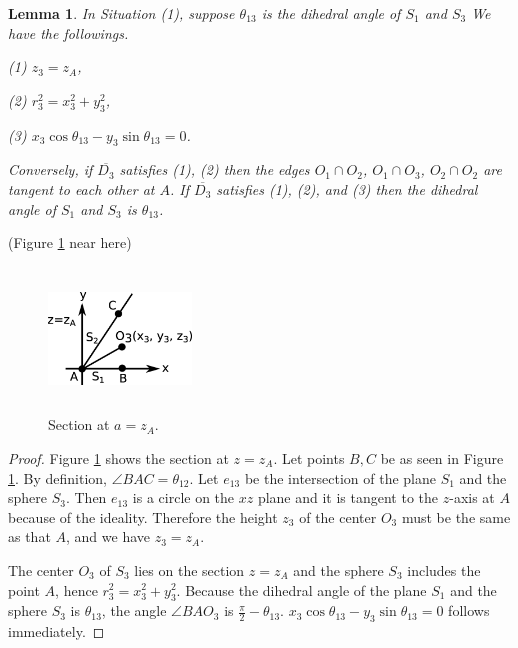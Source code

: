 \documentclass[suppldata, dvipdfmx]{interact}
\theoremstyle{plain}%
\newtheorem{lemma}[theorem]{Lemma}
\theoremstyle{definition}
\theoremstyle{remark}
\theoremstyle{problemstyle}
\begin{document}
\begin{lemma} \label{lemma:CenterOfSphere}
In Situation (1), suppose $\theta_{13}$ is the dihedral angle of $S_1$ and $S_3$   We have the followings.\par
(1) $z_3=z_A$,\par
(2) $r_3^2 = x_3^2+y_3^2$, \par
(3) $x_3\cos\theta_{13} - y_3\sin\theta_{13}=0$.\par
Conversely, if $\overline{D_3}$ satisfies (1), (2) then the edges $O_1 \cap O_2$, $O_1 \cap O_3$, $O_2 \cap O_2$ are tangent to each other at $A$.  If $\overline{D_3}$ satisfies (1), (2), and (3) then the dihedral angle of $S_1$ and $S_3$ is $\theta_{13}$.
\end{lemma}

\noindent(Figure \ref{fig:sectionAtVertex} near here)
\begin{figure}[h!tbp]
 \centering
 \includegraphics[width=1.5in, height=1.5in,
 keepaspectratio]{./img/HexahedraWithSphericalFaces/sectionAtVertex.jpg}
 \caption{Section at $a=z_A$.}
 \label{fig:sectionAtVertex}
   \hspace*{\fill}
\end{figure}

\begin{proof}
Figure \ref{fig:sectionAtVertex} shows the section at $z=z_A$.  Let points $B, C$ be as seen in Figure \ref{fig:sectionAtVertex}.  By definition, $\angle BAC=\theta_{12}$.  Let $e_{13}$ be the intersection of the plane $S_1$ and the sphere $S_3$.  Then $e_{13}$ is a circle on the $xz$ plane and it is tangent to the $z$-axis at $A$ because of the ideality.  Therefore the height $z_3$ of the center $O_3$ must be the same as that $A$, and we have $z_3 = z_A$.\par
The center $O_3$ of $S_3$ lies on the section $z=z_A$ and the sphere $S_3$ includes the point $A$, hence $r_3^2 = x_3^2+y_3^2$.  
Because the dihedral angle of the plane $S_1$ and the sphere $S_3$ is $\theta_{13}$,  the angle $\angle BAO_3$ is $\frac{\pi}{2}-\theta_{13}$.  $x_3\cos\theta_{13} - y_3\sin\theta_{13}=0$ follows immediately. 
\end{proof}
\end{document}
